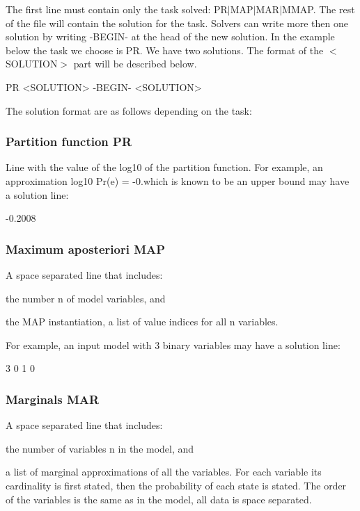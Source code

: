 The first line must contain only the task solved\+: {\ttfamily P\+R$\vert$\+M\+A\+P$\vert$\+M\+A\+R$\vert$\+M\+M\+A\+P}. The rest of the file will contain the solution for the task. Solvers can write more then one solution by writing {\ttfamily -\/\+B\+E\+G\+I\+N-\/} at the head of the new solution. In the example below the task we choose is {\ttfamily P\+R}. We have two solutions. The format of the {\ttfamily $<$S\+O\+L\+U\+T\+I\+O\+N$>$} part will be described below. \begin{DoxyVerb}    PR
    <SOLUTION>
    -BEGIN-
    <SOLUTION>
\end{DoxyVerb}


The solution format are as follows depending on the task\+:

\subsubsection*{Partition function {\ttfamily P\+R}}

Line with the value of the log10 of the partition function. For example, an approximation {\ttfamily log10 Pr(e) = -\/0.}which is known to be an upper bound may have a solution line\+: \begin{DoxyVerb}    -0.2008
\end{DoxyVerb}
 \subsubsection*{Maximum aposteriori {\ttfamily M\+A\+P}}

A space separated line that includes\+:
\begin{DoxyItemize}
\item the number {\ttfamily n} of model variables, and
\item the M\+A\+P instantiation, a list of value indices for all {\ttfamily n} variables.
\end{DoxyItemize}

For example, an input model with 3 binary variables may have a solution line\+: \begin{DoxyVerb}    3 0 1 0
\end{DoxyVerb}


\subsubsection*{Marginals {\ttfamily M\+A\+R}}

A space separated line that includes\+:
\begin{DoxyItemize}
\item the number of variables {\ttfamily n} in the model, and
\item a list of marginal approximations of all the variables. For each variable its cardinality is first stated, then the probability of each state is stated. The order of the variables is the same as in the model, all data is space separated.
\end{DoxyItemize}

